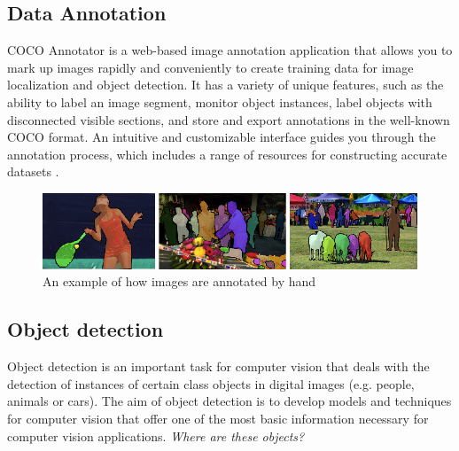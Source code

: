 \subsection{Data Annotation}
COCO Annotator is a web-based image annotation application that allows you to mark up images rapidly and conveniently to create training data for image localization and object detection. It has a variety of unique features, such as the ability to label an image segment, monitor object instances, label objects with disconnected visible sections, and store and export annotations in the well-known COCO format. An intuitive and customizable interface guides you through the annotation process, which includes a range of resources for constructing accurate datasets \cite{brooks_jsbrokscoco-annotator_2021}.
\begin{figure}[h]
    \centering
    \includegraphics[width=1\textwidth]{graphics/coco.png}
    \caption{An example of how images are annotated by hand}
    \label{fig:coco}
\end{figure}
\linespread{0}

\subsection{Object detection}
Object detection is an important task for computer vision that deals with the detection of instances of certain class objects in digital images (e.g. people, animals or cars). The aim of object detection is to develop models and techniques for computer vision that offer one of the most basic information necessary for computer vision applications\cite{zou_object_2019}. \textit{Where are these objects?}

